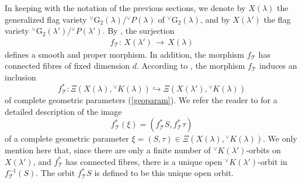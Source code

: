 \documentclass[a4paper, 11pt]{article}
\begin{document}
In keeping with the notation of the previous sections, we denote by
\(X(\lambda)\) the generalized flag variety
\({}^{\vee}\mathrm{G}_{2}(\lambda) / {}^{\vee}P(\lambda)\) of
\({}^{\vee}\mathrm{G}_{2}(\lambda)\), and by \(X(\lambda')\) the flag
variety \({}^{\vee}\mathrm{G}_{2}(\lambda') /
{}^{\vee}P(\lambda')\). By \cite[Proposition 8.8]{ABV}, the surjection
\begin{align}\label{eq:ftee}
f_\mathcal{T}: \, X(\lambda') \, \longrightarrow \, X(\lambda)
\end{align}
defines a  smooth and proper morphism. In addition, the morphism
$f_\mathcal{T}$ has connected fibres of fixed dimension \(d\). 
According to \cite[Proposition 7.15]{ABV}, the morphism
$f_\mathcal{T}$
induces an inclusion
$$f^{*}_{\mathcal{T}}: \Xi(X(\lambda), {}^{\vee}K(\lambda))
\hookrightarrow \Xi(X(\lambda'), {}^{\vee}K(\lambda))$$
of complete geometric parameters (\ref{geoparam}). We refer the reader
to \cite[page 95]{ABV} for a detailed description of the image 
\[
f_\mathcal{T}^{\ast}(\xi) = (f_\mathcal{T}^{\ast}S, f_\mathcal{T}^{\ast}\tau)
\]
of a complete geometric parameter \(\xi = (S, \tau) \in
\Xi(X(\lambda), {}^{\vee}K(\lambda))\). We only mention here that,
since there are only a finite number of
\({}^{\vee}K(\lambda')\)-orbits on \(X(\lambda')\), and
\(f^{\ast}_\mathcal{T}\) has connected fibres, there is a unique open
\({}^{\vee}K(\lambda')\)-orbit in \(f_{\mathcal{T}}^{-1}(S)\). The
orbit \(f_\mathcal{T}^{\ast}S\) is defined to be this unique open
orbit. 
\end{document}
